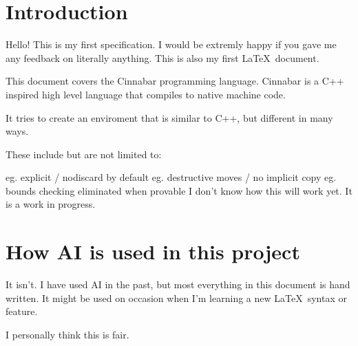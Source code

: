\maketitle
\section{Introduction}

Hello! This is my first specification. I would be extremly happy if you gave me any feedback on literally anything. This is also my first \LaTeX\ document.

This document covers the Cinnabar programming language. Cinnabar is a C++ inspired high level language that compiles to native machine code.

It tries to create an enviroment that is similar to C++, but different in many ways.

\bigskip
These include but are not limited to:

 eg. explicit / nodiscard by default
 eg. destructive moves / no implicit copy 
 eg. bounds checking eliminated when provable
 I don't know how this will work yet. It is a work in progress.


\section{How AI is used in this project}
It isn't. I have used AI in the past, but most everything in this document is hand written. It might be used on occasion when I'm learning a new \LaTeX\ syntax or feature.

I personally think this is fair.

\newpage

\tableofcontents